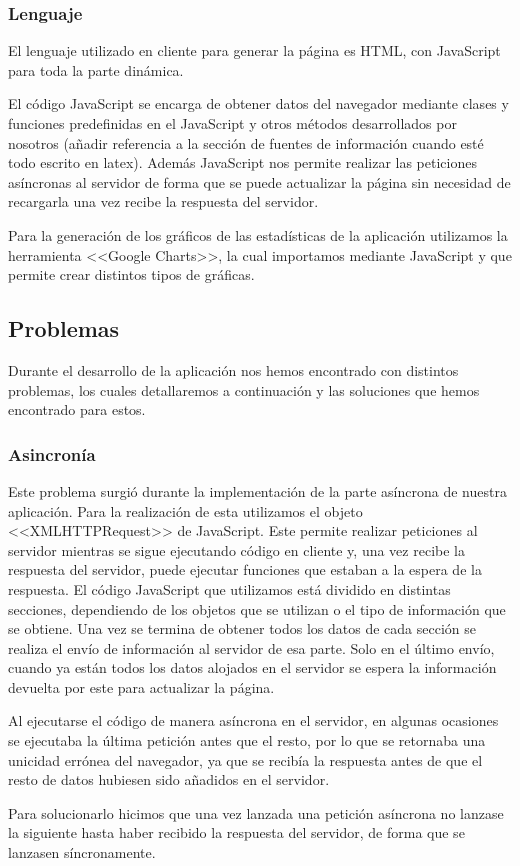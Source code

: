 \subsubsection{Lenguaje}
El lenguaje utilizado en cliente para generar la página es HTML, con JavaScript para toda la parte dinámica.\par 
El código JavaScript se encarga de obtener datos del navegador mediante clases y funciones predefinidas en el JavaScript y otros métodos desarrollados por nosotros (añadir referencia a la sección de fuentes de información cuando esté todo escrito en latex). Además JavaScript nos permite realizar las peticiones asíncronas al servidor de forma que se puede actualizar la página sin necesidad de recargarla una vez recibe la respuesta del servidor.\par 
Para la generación de los gráficos de las estadísticas de la aplicación utilizamos la herramienta <<Google Charts>>, la cual importamos mediante JavaScript y que permite crear distintos tipos de gráficas.
\subsection{Problemas}
Durante el desarrollo de la aplicación nos hemos encontrado con distintos problemas, los cuales detallaremos a continuación y las soluciones que hemos encontrado para estos.
\subsubsection{Asincronía}
Este problema surgió durante la implementación de la parte asíncrona de nuestra aplicación. Para la realización de esta utilizamos el objeto  <<XMLHTTPRequest>> de JavaScript. Este permite realizar peticiones al servidor mientras se sigue ejecutando código en cliente y, una vez recibe la respuesta del servidor, puede ejecutar funciones que estaban a la espera de la respuesta. El código JavaScript que utilizamos está dividido en distintas secciones, dependiendo de los objetos que se utilizan o el tipo de información que se obtiene. Una vez se termina de obtener todos los datos de cada sección se realiza el envío de información al servidor de esa parte. Solo en el último envío, cuando ya están todos los datos alojados en el servidor se espera la información devuelta por este para actualizar la página.\par 
Al ejecutarse el código de manera asíncrona en el servidor, en algunas ocasiones se ejecutaba la última petición antes que el resto, por lo que se retornaba una unicidad errónea del navegador, ya que se recibía la respuesta antes de que el resto de datos hubiesen sido añadidos en el servidor.\par 
Para solucionarlo hicimos que una vez lanzada una petición asíncrona no lanzase la siguiente hasta haber recibido la respuesta del servidor, de forma que se lanzasen síncronamente.
